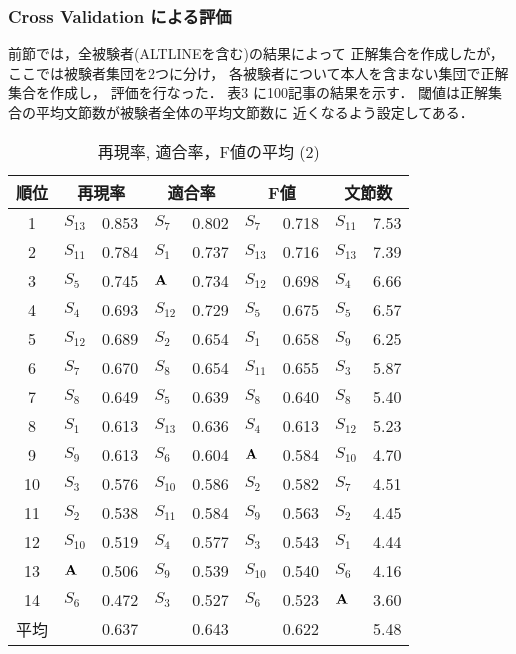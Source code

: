 \subsubsection{Cross Validation による評価}

前節では，全被験者(ALTLINEを含む)の結果によって
正解集合を作成したが，
ここでは被験者集団を2つに分け，
各被験者について本人を含まない集団で正解集合を作成し，
評価を行なった．
表3 に100記事の結果を示す．
閾値は正解集合の平均文節数が被験者全体の平均文節数に
近くなるよう設定してある．

\begin{table}[!htbp]
\begin{center}
\label{table:F-measure2}
\caption{再現率, 適合率，F値の平均 (2)}
\vspace{2mm}
\begin{tabular}{c|p{1.3mm}l|p{1.3mm}l|p{1.3mm}l|p{1.3mm}l}
\hline
順位 & \multicolumn{2}{c|}{再現率} & \multicolumn{2}{c|}{適合率} & 
 \multicolumn{2}{c|}{F値} & \multicolumn{2}{c}{文節数} \\
\hline
1  & $S_{13}$ & 0.853 & $S_{7}$  & 0.802 & $S_{7}$  & 0.718 & $S_{11}$ & 7.53 \\
2  & $S_{11}$ & 0.784 & $S_{1}$  & 0.737 & $S_{13}$ & 0.716 & $S_{13}$ & 7.39 \\
3  & $S_{5}$  & 0.745 & $\bf{A}$ & 0.734 & $S_{12}$ & 0.698 & $S_{4}$  & 6.66 \\
4  & $S_{4}$  & 0.693 & $S_{12}$ & 0.729 & $S_{5}$  & 0.675 & $S_{5}$  & 6.57 \\
5  & $S_{12}$ & 0.689 & $S_{2}$  & 0.654 & $S_{1}$  & 0.658 & $S_{9}$  & 6.25 \\
6  & $S_{7}$  & 0.670 & $S_{8}$  & 0.654 & $S_{11}$ & 0.655 & $S_{3}$  & 5.87 \\
7  & $S_{8}$  & 0.649 & $S_{5}$  & 0.639 & $S_{8}$  & 0.640 & $S_{8}$  & 5.40 \\
8  & $S_{1}$  & 0.613 & $S_{13}$ & 0.636 & $S_{4}$  & 0.613 & $S_{12}$ & 5.23 \\
9  & $S_{9}$  & 0.613 & $S_{6}$  & 0.604 & $\bf{A}$ & 0.584 & $S_{10}$ & 4.70 \\
10 & $S_{3}$  & 0.576 & $S_{10}$ & 0.586 & $S_{2}$  & 0.582 & $S_{7}$  & 4.51 \\
11 & $S_{2}$  & 0.538 & $S_{11}$ & 0.584 & $S_{9}$  & 0.563 & $S_{2}$  & 4.45 \\
12 & $S_{10}$ & 0.519 & $S_{4}$  & 0.577 & $S_{3}$  & 0.543 & $S_{1}$  & 4.44 \\
13 & $\bf{A}$ & 0.506 & $S_{9}$  & 0.539 & $S_{10}$ & 0.540 & $S_{6}$  & 4.16 \\
14 & $S_{6}$  & 0.472 & $S_{3}$  & 0.527 & $S_{6}$  & 0.523 & $\bf{A}$ & 3.60 \\
\hline
平均 & & 0.637 & & 0.643 & & 0.622 & & 5.48 \\
\hline
\end{tabular}
\end{center}
\end{table}


